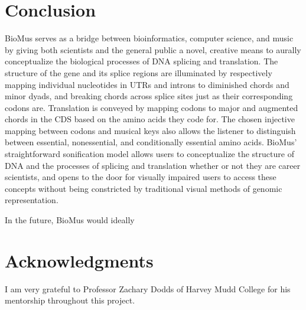 \documentclass[letterpaper]{article}
\begin{document}
\section{Conclusion}
BioMus serves as a bridge between bioinformatics, computer science, and music by giving both scientists and the general public a novel, creative means to aurally conceptualize the biological processes of DNA splicing and translation. The structure of the gene and its splice regions are illuminated by respectively mapping individual nucleotides in UTRs and introns to diminished chords and minor dyads, and breaking chords across splice sites just as their corresponding codons are. Translation is conveyed by mapping codons to major and augmented chords in the CDS based on the amino acids they code for. The chosen injective mapping between codons and musical keys also allows the listener to distinguish between essential, nonessential, and conditionally essential amino acids. BioMus' straightforward sonification model allows users to conceptualize the structure of DNA and the processes of splicing and translation whether or not they are career scientists, and opens to the door for visually impaired users to access these concepts without being constricted by traditional visual methods of genomic representation. 

In the future, BioMus would ideally 


\section{Acknowledgments}

I am very grateful to Professor Zachary Dodds of Harvey Mudd College for his mentorship throughout this project.




\end{document}
